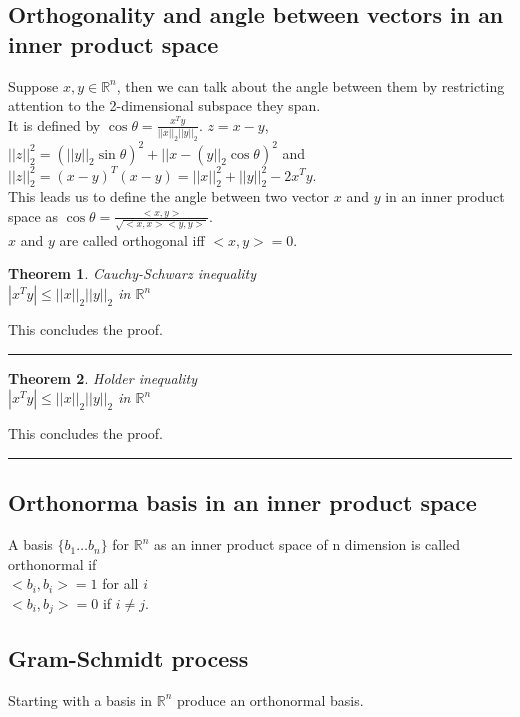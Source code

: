 \documentclass[twoside]{article}
\newcounter{lecnum}
\newtheorem{theorem}{Theorem}[lecnum]
\newenvironment{proof}{{\bf Proof:}}{\hfill\rule{2mm}{2mm}}
\begin{document}
\subsection{Orthogonality and angle between vectors in an inner product space}
Suppose $x,y \in \mathbb{R}^n$, then we can talk about the angle between them by restricting attention to the 2-dimensional subspace they span.\\
It is defined by $\cos \theta=\frac{x^T y}{||x||_2 ||y||_2}$.
$z=x-y$, $||z||_2^2=(||y||_2\sin\theta)^2+||x-(y||_2\cos\theta)^2$ and $||z||_2^2=(x-y)^T(x-y)=||x||_2^2+||y||_2^2-2x^Ty$.\\
This leads us to define the angle between two vector $x$ and $y$ in an inner product space as $\cos\theta=\frac{<x,y>}{\sqrt{<x,x><y,y>}}$.\\
$x$ and $y$ are called orthogonal iff $<x,y>=0$.

\begin{theorem}
Cauchy-Schwarz inequality\\
$|x^Ty|\le ||x||_2||y||_2$ in $\mathbb{R}^n$\\

\end{theorem}

\begin{proof}

This concludes the proof.
\end{proof}

\begin{theorem}
   Holder inequality\\
   $|x^Ty|\le ||x||_2||y||_2$ in $\mathbb{R}^n$\\
   
\end{theorem}
   
\begin{proof}
   
   This concludes the proof.
\end{proof}

\subsection{Orthonorma basis in an inner product space}
A basis $\{b_1\hdots b_n\}$ for $\mathbb{R}^n$ as an inner product space of n dimension is called orthonormal if\\
 $<b_i, b_i>=1$ for all $i$\\
$<b_i,b_j>=0$ if $i \neq j$.

\subsection{Gram-Schmidt process}
Starting with a basis in $\mathbb{R}^n$ produce an orthonormal basis.
\end{document}
